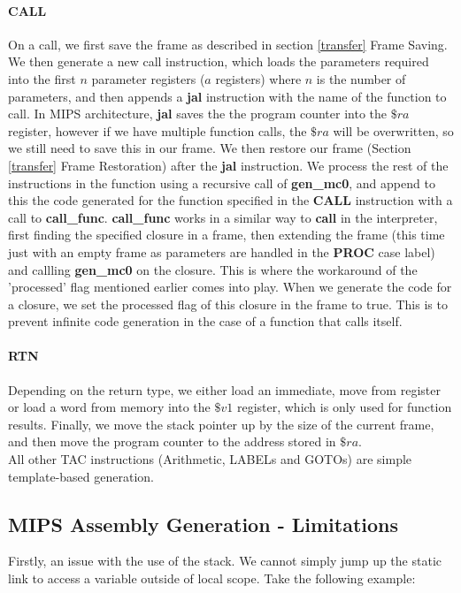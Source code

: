 \documentclass[12pt]{article}
\begin{document}
\paragraph{CALL} On a call, we first save the frame as described in section \ref{transfer} Frame Saving. We then generate a new call instruction, which loads the parameters required into the first $n$ parameter registers ($a$ registers) where $n$ is the number of parameters, and then appends a \textbf{jal} instruction with the name of the function to call. In MIPS architecture, \textbf{jal} saves the the program counter into the $\$ra$ register, however if we have multiple function calls, the $\$ra$ will be overwritten, so we still need to save this in our frame. We then restore our frame (Section \ref{transfer} Frame Restoration) after the \textbf{jal} instruction. 
We process the rest of the instructions in the function using a recursive call of \textbf{gen\_mc0}, and append to this the code generated for the function specified in the \textbf{CALL} instruction with a call to \textbf{call\_func}. \textbf{call\_func} works in a similar way to \textbf{call} in the interpreter, first finding the specified closure in a frame, then extending the frame (this time just with an empty frame as parameters are handled in the \textbf{PROC} case label) and callling \textbf{gen\_mc0} on the closure. This is where the workaround of the 'processed' flag mentioned earlier comes into play. When we generate the code for a closure, we set the processed flag of this closure in the frame to true. This is to prevent infinite code generation in the case of a function that calls itself.
\paragraph{RTN} Depending on the return type, we either load an immediate, move from register or load a word from memory into the $\$v1$ register, which is only used for function results. Finally, we move the stack pointer up by the size of the current frame, and then move the program counter to the address stored in $\$ra$.
\\\newline All other TAC instructions (Arithmetic, LABELs and GOTOs) are simple template-based generation.

\subsection{MIPS Assembly Generation - Limitations}
Firstly, an issue with the use of the stack. We cannot simply jump up the static link to access a variable outside of local scope. Take the following example:
\end{document}
